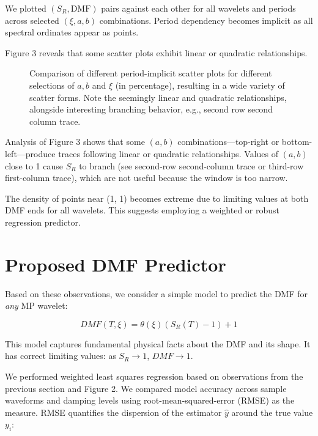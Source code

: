We plotted \((S_R, \text{DMF})\) pairs against each other for all
wavelets and periods across selected \((\xi, a, b)\) combinations.
Period dependency becomes implicit as all spectral ordinates appear as
points.

Figure 3 reveals that some scatter plots exhibit linear or quadratic
relationships.

\begin{figure}
\centering
{}
\caption{Comparison of different period-implicit scatter plots for
different selections of \(a, b\) and \(\xi\) (in percentage), resulting
in a wide variety of scatter forms. Note the seemingly linear and
quadratic relationships, alongside interesting branching behavior, e.g.,
second row second column trace.}
\end{figure}

Analysis of Figure 3 shows that some \((a, b)\) combinations---top-right
or bottom-left---produce traces following linear or quadratic
relationships. Values of \((a, b)\) close to 1 cause \(S_R\) to branch
(see second-row second-column trace or third-row first-column trace),
which are not useful because the window is too narrow.

The density of points near (1, 1) becomes extreme due to limiting values
at both DMF ends for all wavelets. This suggests employing a weighted or
robust regression predictor.

\section{Proposed DMF Predictor}\label{proposed-dmf-predictor}

Based on these observations, we consider a simple model to predict the
DMF for \emph{any} MP wavelet:

\[DMF(T, \xi) = \theta(\xi) (S_R(T) - 1) + 1\]

This model captures fundamental physical facts about the DMF and its
shape. It has correct limiting values: as \(S_R \to 1\), \(DMF \to 1\).

We performed weighted least squares regression based on observations
from the previous section and Figure 2. We compared model accuracy
across sample waveforms and damping levels using root-mean-squared-error
(RMSE) as the measure. RMSE quantifies the dispersion of the estimator
\(\widehat{y}\) around the true value \(y_i\):


